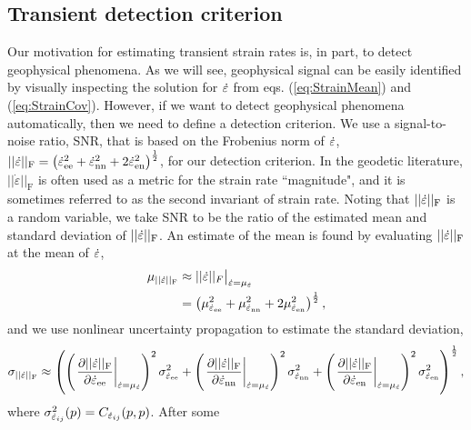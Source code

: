 \documentclass[extra,mreferee]{gji}
\begin{document}
\subsection{Transient detection criterion}\label{sec:TransientDetection}

Our motivation for estimating transient strain rates is, in part, to
detect geophysical phenomena. As we will see, geophysical signal can
be easily identified by visually inspecting the solution for $\dot\varepsilon$
from eqs. (\ref{eq:StrainMean}) and (\ref{eq:StrainCov}). However, if
we want to detect geophysical phenomena automatically, then we need to
define a detection criterion. We use a signal-to-noise ratio, SNR,
that is based on the Frobenius norm of $\dot\varepsilon$,
$||\dot\varepsilon||_\mathrm{F} = \left(\dot\varepsilon_{\mathrm{e}\mathrm{e}}^2 + \dot\varepsilon_{\mathrm{n}\mathrm{n}}^2 +
2\dot\varepsilon_{\mathrm{e}\mathrm{n}}^2\right)^{\frac{1}{2}}$, for our detection criterion.
In the geodetic literature, $||\dot{\varepsilon}||_\mathrm{F}$ is
often used as a metric for the strain rate ``magnitude", and it is
sometimes referred to as the second invariant of strain rate. Noting
that $||\dot\varepsilon||_\mathrm{F}$ is a random variable, we take SNR to be
the ratio of the estimated mean and standard deviation of
$||\dot\varepsilon||_\mathrm{F}$. An estimate of the mean is found by
evaluating $||\dot\varepsilon||_\mathrm{F}$ at the mean of $\dot\varepsilon$,
\begin{align}
\mu_{||\dot\varepsilon||_\mathrm{F}} &\approx ||\dot\varepsilon||_F \big|_{\dot\varepsilon = \mu_{\dot\varepsilon}}\nonumber \\
                             &= \left(\mu_{\dot\varepsilon_{\mathrm{e}\mathrm{e}}}^2 + 
                                      \mu_{\dot\varepsilon_{\mathrm{n}\mathrm{n}}}^2 + 
                                      2\mu_{\dot\varepsilon_{\mathrm{e}\mathrm{n}}}^2 \right)^\frac{1}{2},
\end{align}
and we use nonlinear uncertainty propagation to estimate the standard
deviation,
\begin{equation}
\sigma_{||\dot\varepsilon||_\mathrm{F}} \approx
\left( \left(\left. \frac{\partial ||\dot\varepsilon||_\mathrm{F}}{\partial \dot\varepsilon_{\mathrm{e}\mathrm{e}}}\right|_{\dot\varepsilon = \mu_{\dot\varepsilon}} \right)^2 
       \sigma^2_{\dot\varepsilon_{\mathrm{e}\mathrm{e}}} +
       \left(\left. \frac{\partial ||\dot\varepsilon||_\mathrm{F}}{\partial \dot\varepsilon_{\mathrm{n}\mathrm{n}}}\right|_{\dot\varepsilon = \mu_{\dot\varepsilon}} \right)^2
       \sigma^2_{\dot\varepsilon_{\mathrm{n}\mathrm{n}}} +
       \left(\left. \frac{\partial ||\dot\varepsilon||_\mathrm{F}}{\partial \dot\varepsilon_{\mathrm{e}\mathrm{n}}}\right|_{\dot\varepsilon = \mu_{\dot\varepsilon}} \right)^2 
       \sigma^2_{\dot\varepsilon_{\mathrm{e}\mathrm{n}}} \right)^\frac{1}{2},
\end{equation}
where $\sigma^2_{\dot\varepsilon_{ij}}(p) = C_{\dot\varepsilon_{ij}}(p,p)$. After some
\end{document}
